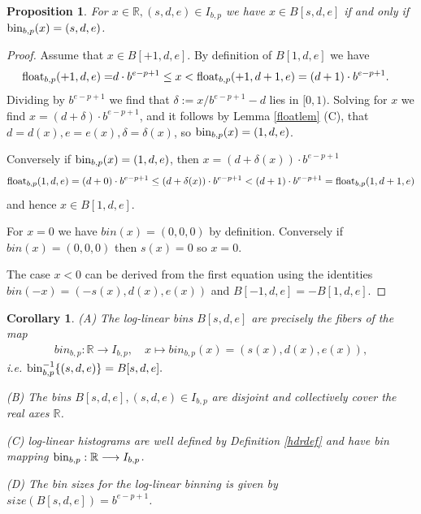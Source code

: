 \documentclass{article}
\theoremstyle{plain}
\newtheorem{proposition}[definition]{Proposition}
\newtheorem{corollary}[definition]{Corollary}
\theoremstyle{remark}
\newcommand{\IR}{\mathbb{R}}
\newcommand{\lra}{\longrightarrow}
\begin{document}
\begin{proposition} \label{hdrprop}
  For $x \in \IR, (s,d,e) \in I_{b,p}$ we have $x \in B[s,d,e]$ if and only if $\mathrm{bin}_{b,p}(x) = (s,d,e)$.
\end{proposition}
\begin{proof}
  Assume that $x \in B[+1,d,e]$. By definition of $B[1,d,e]$ we have
  \begin{align*}
    \mathrm{float}_{b,p}(+1,d,e) = & d \cdot b^{e-p+1} \leq x < \mathrm{float}_{b,p}(+1,d+1, e) = (d+1) \cdot b^{e-p+1}.
  \end{align*}
  Dividing by $b^{e-p+1}$ we find that $\delta := x/b^{e-p+1} - d$ lies in $[0,1)$.
  Solving for $x$ we find $x = (d + \delta) \cdot b^{e-p+1}$, and it follows by
  Lemma \ref{floatlem} (C), that $d=d(x), e=e(x), \delta = \delta(x)$, so $\mathrm{bin}_{b,p}(x) = (1,d,e)$.

  Conversely if $\mathrm{bin}_{b,p}(x) = (1,d,e)$, then $x = (d + \delta(x)) \cdot b^{e - p + 1}$
  \begin{align*}
      \mathrm{float}_{b,p}(1,d,e) = (d + 0) \cdot b^{e - p + 1} \leq (d + \delta(x)) \cdot b^{e - p + 1} <  (d + 1) \cdot b^{e - p + 1} = \mathrm{float}_{b,p}(1,d+1,e)
  \end{align*}
  and hence $x \in B[1,d,e]$.

  For $x = 0$ we have $bin(x) = (0,0,0)$ by definition.
  Conversely if $bin(x) = (0,0,0)$ then $s(x) = 0$ so $x = 0$.

  The case $x < 0$ can be derived from the first equation using the identities $bin(-x)=(-s(x),d(x),e(x))$ and $B[-1,d,e] = -B[1,d,e]$.
\end{proof}

\begin{corollary}
  (A) The log-linear bins $B[s,d,e]$ are precisely the fibers of the map
  \begin{align*}
    bin_{b,p}: \IR \lra I_{b,p}, \quad x \mapsto bin_{b,p}(x) = (s(x), d(x), e(x) ),
  \end{align*}
  i.e. $\mathrm{bin}_{b,p}^{-1}\{(s,d,e)\} = B[s,d,e].$

  (B) The bins $B[s,d,e], (s,d,e) \in I_{b,p}$ are disjoint and collectively cover the real axes $\IR$.

  (C) log-linear histograms are well defined by Definition \ref{hdrdef} and have bin mapping $\bin_{b,p}: \IR \lra I_{b,p}$.

  (D) The bin sizes for the log-linear binning is given by $size(B[s,d,e]) = b^{e-p+1}$.
\end{corollary}
\end{document}
